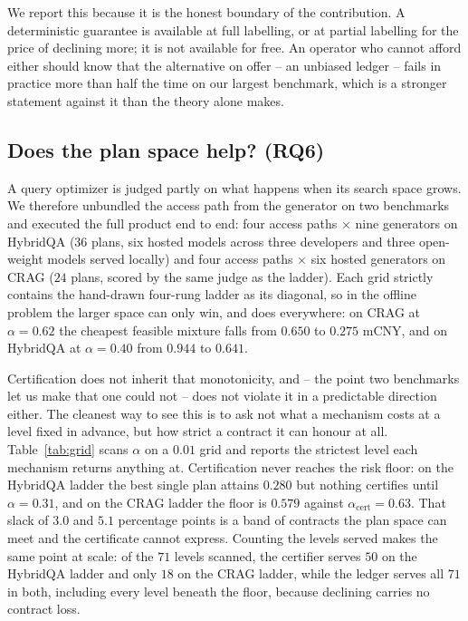 We report this because it is the honest boundary of the contribution. A
deterministic guarantee is available at full labelling, or at partial
labelling for the price of declining more; it is not available for free.
An operator who cannot afford either should know that the alternative on
offer -- an unbiased ledger -- fails in practice more than half the time
on our largest benchmark, which is a stronger statement against it than
the theory alone makes.



\subsection{Does the plan space help? (RQ6)}
\label{sec:res:grid}

A query optimizer is judged partly on what happens when its search space
grows. We therefore unbundled the access path from the generator on two
benchmarks and executed the full product end to end: four access paths
$\times$ nine generators on HybridQA ($36$ plans, six hosted models
across three developers and three open-weight models served locally) and
four access paths $\times$ six hosted generators on CRAG ($24$ plans,
scored by the same judge as the ladder). Each grid strictly contains the
hand-drawn four-rung ladder as its diagonal, so in the offline problem
the larger space can only win, and does everywhere: on CRAG at
$\alpha = 0.62$ the cheapest feasible mixture falls from $0.650$ to
$0.275$ mCNY, and on HybridQA at $\alpha = 0.40$ from $0.944$ to
$0.641$.

Certification does not inherit that monotonicity, and -- the point two
benchmarks let us make that one could not -- does not violate it in a
predictable direction either. The cleanest way to see this is to ask not
what a mechanism costs at a level fixed in advance, but how strict a
contract it can honour at all. Table~\ref{tab:grid} scans $\alpha$ on a
$0.01$ grid and reports the strictest level each mechanism returns
anything at. Certification never reaches the risk floor: on the HybridQA
ladder the best single plan attains $0.280$ but nothing certifies until
$\alpha = 0.31$, and on the CRAG ladder the floor is $0.579$ against
$\alpha_{\mathrm{cert}} = 0.63$. That slack of $3.0$ and $5.1$
percentage points is a band of contracts the plan space can meet and the
certificate cannot express.
Counting the levels served makes the same point at scale: of the $71$
levels scanned, the certifier serves $50$ on the HybridQA ladder and
only $18$ on the CRAG ladder, while the ledger serves all $71$ in both,
including every level beneath the floor, because declining carries no
contract loss.


